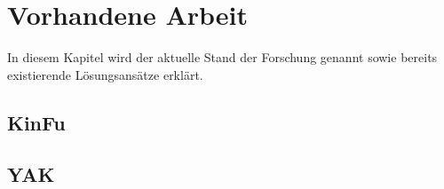 
\chapter{Vorhandene Arbeit}
\label{ch:vorhandene-arbeit}

In diesem Kapitel wird der aktuelle Stand der Forschung genannt sowie bereits existierende Lösungsansätze erklärt.


\section{\ac{KinFu}}
\label{sec:kinfu}

\section{\ac{YAK}}
\label{sec:yak}
